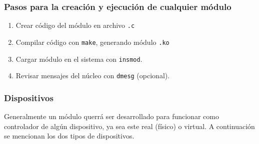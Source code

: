 \subsubsection{Pasos para la creación y ejecución de cualquier módulo}

\begin{enumerate}
	\item Crear código del módulo en archivo \texttt{.c}
	\item Compilar código con \texttt{make}, generando módulo \texttt{.ko}
	\item Cargar módulo en el sistema con \texttt{insmod}.
	\item Revisar mensajes del núcleo con \texttt{dmesg} (opcional).
\end{enumerate}

\subsubsection{Dispositivos}
Generalmente un módulo querrá ser desarrollado para funcionar como controlador de algún dispositivo, ya sea este real (físico) o virtual. A continuación se mencionan los dos tipos de dispositivos.

